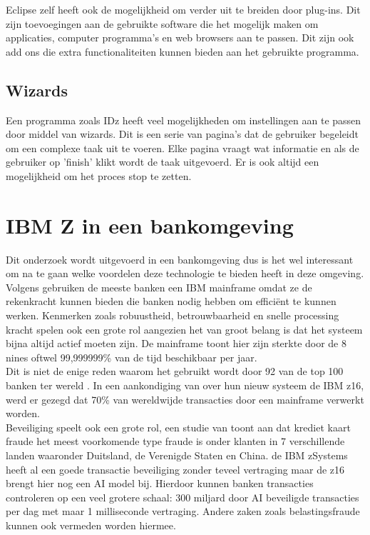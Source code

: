 Eclipse zelf heeft ook de mogelijkheid om verder uit te breiden door plug-ins. Dit zijn toevoegingen aan de gebruikte software die het mogelijk maken om applicaties, computer programma's en web browsers aan te passen. Dit zijn ook add ons die extra functionaliteiten kunnen bieden aan het gebruikte programma. \autocite{George2021}

\subsection{Wizards}
Een programma zoals IDz heeft veel mogelijkheden om instellingen aan te passen door middel van wizards. Dit is een serie van pagina's dat de gebruiker begeleidt om een complexe taak uit te voeren. Elke pagina vraagt wat informatie en als de gebruiker op 'finish' klikt wordt de taak uitgevoerd. Er is ook altijd een mogelijkheid om het proces stop te zetten. \autocite{Eclipse2006}

\section{IBM Z in een bankomgeving}
Dit onderzoek wordt uitgevoerd in een bankomgeving dus is het wel interessant om na te gaan welke voordelen deze technologie te bieden heeft in deze omgeving. \\ 

Volgens \textcite{Turner2022} gebruiken de meeste banken een IBM mainframe omdat ze de rekenkracht kunnen bieden die banken nodig hebben om efficiënt te kunnen werken. Kenmerken zoals robuustheid, betrouwbaarheid en snelle processing kracht spelen ook een grote rol aangezien het van groot belang is dat het systeem bijna altijd actief moeten zijn. De mainframe toont hier zijn sterkte door de 8 nines oftwel 99,999999\% van de tijd beschikbaar per jaar. \autocite{IBMa} \\

Dit is niet de enige reden waarom het gebruikt wordt door 92 van de top 100 banken ter wereld \autocite{Tozzi2022}. In een aankondiging van \textcite{IBM2022} over hun nieuw systeem de IBM z16, werd er gezegd dat 70\% van wereldwijde transacties door een mainframe verwerkt worden. \\

Beveiliging speelt ook een grote rol, een studie van \textcite{MorningConsult2022} toont aan dat krediet kaart fraude het meest voorkomende type fraude is onder klanten in 7 verschillende landen waaronder Duitsland, de Verenigde Staten en China. de IBM zSystems heeft al een goede transactie beveiliging zonder teveel vertraging maar de z16 brengt hier nog een AI model bij. Hierdoor kunnen banken transacties controleren op een veel grotere schaal: 300 miljard door AI beveiligde transacties per dag met maar 1 milliseconde vertraging. Andere zaken zoals belastingsfraude kunnen ook vermeden worden hiermee. \autocite{IBM2022} \\

